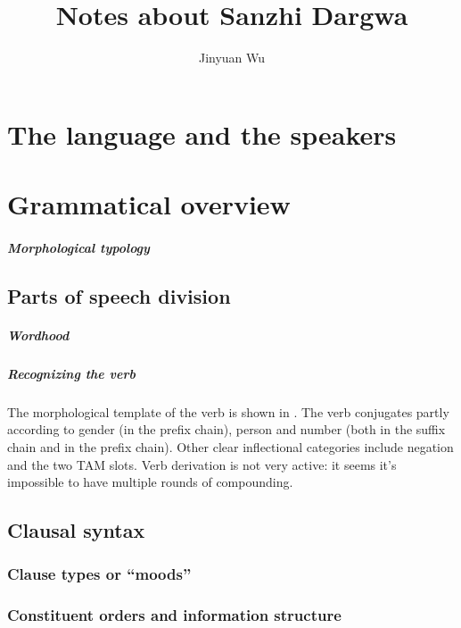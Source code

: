 \documentclass[a4paper, oneside, 12pt]{report}
\title{Notes about Sanzhi Dargwa}
\author{Jinyuan Wu}
\newcommand*{\citetable}[1]{Table~{#1}}
\begin{document}
\maketitle

\chapter{The language and the speakers}

\chapter{Grammatical overview}

\paragraph*{Morphological typology}

\section{Parts of speech division}

\paragraph*{Wordhood}

\paragraph*{Recognizing the verb}
The morphological template of the verb
is shown in \citet[\citetable{11.9}]{forker2020grammar}.
The verb conjugates partly according to
gender (in the prefix chain), person and number 
(both in the suffix chain and in the prefix chain). 
Other clear inflectional categories include 
negation and the two TAM slots.
Verb derivation is not very active:
it seems it's impossible to have multiple rounds of compounding.

\section{Clausal syntax}

\subsection{Clause types or ``moods''} 

\subsection{Constituent orders and information structure}
\end{document}
